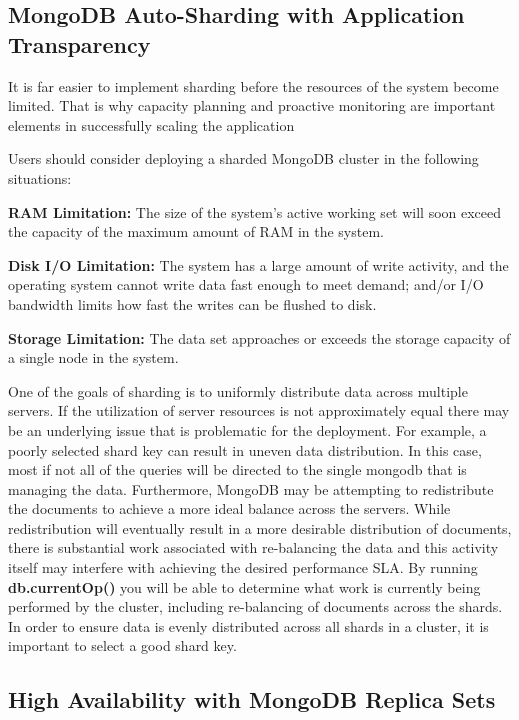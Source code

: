 \documentclass[9pt,twocolumn,twoside]{styles/osajnl}
\begin{document}
\subsection {MongoDB Auto-Sharding with Application Transparency}

It is far easier to implement sharding before the resources of the system become limited. That is why capacity planning and proactive monitoring are important elements in successfully scaling the application

Users should consider deploying a sharded MongoDB cluster in the following situations:

{\bfseries RAM Limitation:} The size of the system’s active working set will soon exceed the capacity of the maximum amount of RAM in the system.

{\bfseries Disk I/O Limitation:} The system has a large amount of write activity, and the operating system cannot write data fast enough to meet demand; and/or I/O bandwidth limits how fast the writes can be flushed to disk.

{\bfseries Storage Limitation:} The data set approaches or exceeds the storage capacity of a single node in the system.

One of the goals of sharding is to uniformly distribute data across multiple servers. If the utilization of server resources is not approximately equal there may be an underlying issue that is problematic for the deployment. For example, a poorly selected shard key can result in uneven data distribution. In this case, most if not all of the queries will be directed to the single mongodb that is managing the data.
Furthermore, MongoDB may be attempting to redistribute the documents to achieve a more ideal balance across the servers. While redistribution will eventually result in a more desirable distribution of documents, there is substantial work associated with re-balancing the data and this activity itself may interfere with achieving the desired performance SLA.
By running {\bfseries db.currentOp()} you will be able to determine what work is currently being performed by the cluster, including re-balancing of documents across the shards.
In order to ensure data is evenly distributed across all shards in a cluster, it is important to select a good shard key.

\subsection {High Availability with MongoDB Replica Sets}
\end{document}
